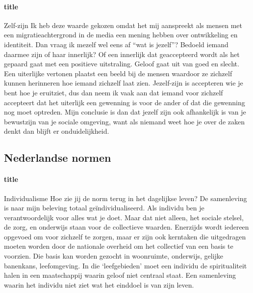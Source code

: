 \documentclass[11pt]{report}
\begin{document}
\paragraph{title}
Zelf-zijn
Ik heb deze waarde gekozen omdat het mij aanspreekt als mensen met een migratieachtergrond in de media een mening hebben over ontwikkeling en identiteit. Dan vraag ik mezelf wel eens af “wat is jezelf”? Bedoeld iemand daarmee zijn of haar innerlijk? Of een innerlijk dat geaccepteerd wordt als het gepaard gaat met een positieve uitstraling. Geloof gaat uit van goed en slecht. Een uiterlijke vertonen plaatst een beeld bij de mensen waardoor ze zichzelf kunnen herinneren hoe iemand zichzelf laat zien. Jezelf-zijn is accepteren wie je bent hoe je eruitziet, dus dan neem ik vaak aan dat iemand voor zichzelf accepteert dat het uiterlijk een gewenning is voor de ander of dat die gewenning nog moet optreden. Mijn conclusie is dan dat jezelf zijn ook afhankelijk is van je bewustzijn van je sociale omgeving, want als niemand weet hoe je over de zaken denkt dan blijft er onduidelijkheid.

\subsection{Nederlandse normen}

\paragraph{title}
Individualisme
Hoe zie jij de norm terug in het dagelijkse leven?
De samenleving is naar mijn beleving totaal geïndividualiseerd. Als individu ben je verantwoordelijk voor alles wat je doet. Maar dat niet alleen, het sociale stelsel, de zorg, en onderwijs staan voor de collectieve waarden. Enerzijds wordt iedereen opgevoed om voor zichzelf te zorgen, maar er zijn ook kerntaken die uitgedragen moeten worden door de nationale overheid om het collectief van een basis te voorzien. Die basis kan worden gezocht in woonruimte, onderwijs, gelijke banenkans, leefomgeving. In die ‘leefgebieden’ moet een individu de spiritualiteit halen in een maatschappij waarin geloof niet centraal staat. Een samenleving waarin het individu niet ziet wat het einddoel is van zijn leven.
\end{document}
